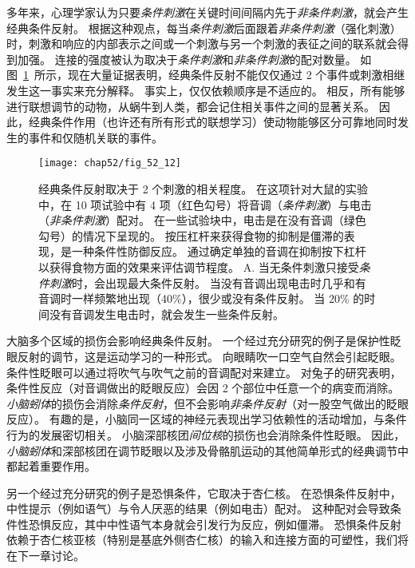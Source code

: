 多年来，心理学家认为只要\textit{条件刺激}在关键时间间隔内先于\textit{非条件刺激}，就会产生经典条件反射。
根据这种观点，每当\textit{条件刺激}后面跟着\textit{非条件刺激}（强化刺激）时，刺激和响应的内部表示之间或一个刺激与另一个刺激的表征之间的联系就会得到加强。
连接的强度被认为取决于\textit{条件刺激}和\textit{非条件刺激}的配对数量。
如图~\ref{fig:52_12}~所示，现在大量证据表明，经典条件反射不能仅仅通过 2 个事件或刺激相继发生这一事实来充分解释。
事实上，仅仅依赖顺序是不适应的。
相反，所有能够进行联想调节的动物，从蜗牛到人类，都会记住相关事件之间的显著关系。
因此，经典条件作用（也许还有所有形式的联想学习）使动物能够区分可靠地同时发生的事件和仅随机关联的事件。


\begin{figure}[htbp]
	\centering
	\texttt{[image: chap52/fig\_52\_12]}
	\caption{经典条件反射取决于 2 个刺激的相关程度。
		在这项针对大鼠的实验中，在 10 项试验中有 4 项（红色勾号）将音调（\textit{条件刺激}）与电击（\textit{非条件刺激}）配对。
		在一些试验块中，电击是在没有音调（绿色勾号）的情况下呈现的。
		按压杠杆来获得食物的抑制是僵滞的表现，是一种条件性防御反应。
		通过确定单独的音调在抑制按下杠杆以获得食物方面的效果来评估调节程度\cite{rescorla1968probability}。
		A. 当无条件刺激只接受\textit{条件刺激}时，会出现最大条件反射。 
		当没有音调出现电击时几乎和有音调时一样频繁地出现（40\%），很少或没有条件反射。
		当 20\% 的时间没有音调发生电击时，就会发生一些条件反射。}
	\label{fig:52_12}
\end{figure}


大脑多个区域的损伤会影响经典条件反射。
一个经过充分研究的例子是保护性眨眼反射的调节，这是运动学习的一种形式。
向眼睛吹一口空气自然会引起眨眼。
条件性眨眼可以通过将吹气与吹气之前的音调配对来建立。
对兔子的研究表明，条件性反应（对音调做出的眨眼反应）会因 2 个部位中任意一个的病变而消除。
\textit{小脑蚓体}的损伤会消除\textit{条件反射}，但不会影响\textit{非条件反射}（对一股空气做出的眨眼反应）。
有趣的是，小脑同一区域的神经元表现出学习依赖性的活动增加，与条件行为的发展密切相关。
小脑深部核团\textit{间位核}的损伤也会消除条件性眨眼。
因此，\textit{小脑蚓体}和深部核团在调节眨眼以及涉及骨骼肌运动的其他简单形式的经典调节中都起着重要作用。


另一个经过充分研究的例子是恐惧条件，它取决于杏仁核。
在恐惧条件反射中，中性提示（例如语气）与令人厌恶的结果（例如电击）配对。
这种配对会导致条件性恐惧反应，其中中性语气本身就会引发行为反应，例如僵滞。
恐惧条件反射依赖于杏仁核亚核（特别是基底外侧杏仁核）的输入和连接方面的可塑性，我们将在下一章讨论。



